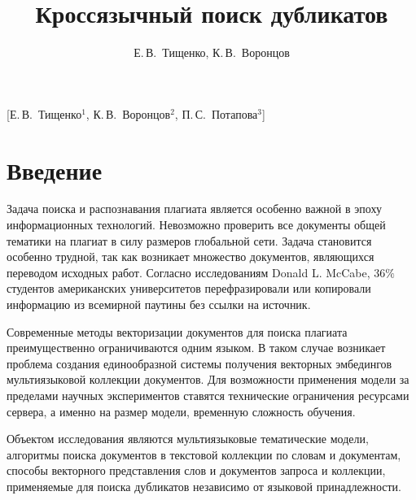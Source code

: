 \documentclass[12pt, twoside]{article}
\begin{document}
\title
    []
    {Кроссязычный поиск дубликатов}

\author
    [Е.\,В.~Тищенко]
    {Е.\,В.~Тищенко, К.\,В.~Воронцов}
    [Е.\,В.~Тищенко$^1$, К.\,В.~Воронцов$^2$, П.\,С.~Потапова$^3$]


\maketitle
\linenumbers
\section{Введение}

Задача поиска и распознавания плагиата является особенно важной в эпоху информационных технологий. Невозможно проверить все документы общей тематики на плагиат в силу размеров глобальной сети. Задача становится особенно трудной, так как возникает множество документов, являющихся переводом исходных работ. Согласно исследованиям Donald L. McCabe,\cite{donaldSurvey}  $ 36\% $ студентов американских университетов перефразировали или копировали информацию из всемирной паутины без ссылки на источник. 

Современные методы векторизации документов для поиска плагиата  \cite{methodMLPlag, regression} преимущественно ограничиваются одним языком. В таком случае возникает проблема создания единообразной системы получения векторных эмбедингов мультиязыковой коллекции документов. Для возможности применения модели за пределами научных экспериментов ставятся технические ограничения ресурсами сервера, а именно на размер модели, временную сложность обучения.

Объектом исследования являются мультиязыковые тематические модели, алгоритмы поиска документов в текстовой коллекции по словам и документам, способы векторного представления слов и документов запроса и коллекции, применяемые для поиска дубликатов независимо от языковой принадлежности.
\end{document}
